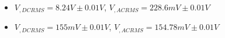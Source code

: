 \begin{itemize}
     \item $V_{, DCRMS}=8.24V\pm 0.01\unit{V}$, $V_{, ACRMS}=228.6mV\pm 0.01\unit{V}$ 
     \item $V_{, DCRMS}=155mV\pm 0.01\unit{V}$, $V_{, ACRMS}=154.78mV\pm 0.01\unit{V}$\\
\end{itemize}